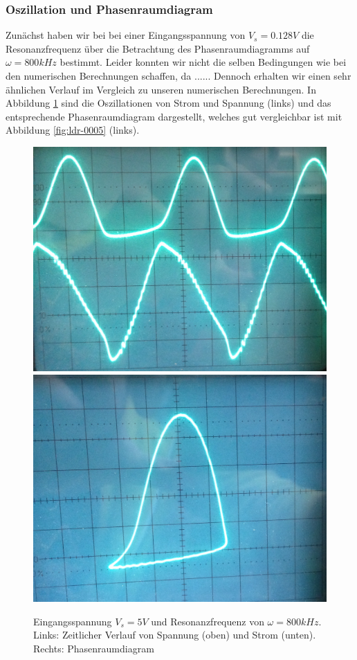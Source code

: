 \documentclass{scrartcl}
\begin{document}
\subsubsection { Oszillation und Phasenraumdiagram }
Zunächst haben wir bei bei einer Eingangsspannung von $V_s=0.128V$ die Resonanzfrequenz über die Betrachtung des Phasenraumdiagramms auf $\omega=800kHz$ bestimmt. Leider konnten wir nicht die selben Bedingungen wie bei den numerischen Berechnungen schaffen, da ...... Dennoch erhalten wir einen sehr ähnlichen Verlauf im Vergleich zu unseren numerischen Berechnungen. In Abbildung \ref{fig:ldr-real1} sind die Oszillationen von Strom und Spannung (links) und das entsprechende Phasenraumdiagram dargestellt, welches gut vergleichbar ist mit Abbildung \ref{fig:ldr-0005} (links).
\begin{figure}
\centering
\includegraphics[scale=0.1]{800khz-5V-oszi}
\includegraphics[scale=0.11]{800khz-5V-phase}
\caption{Eingangsspannung $V_s=5V$ und Resonanzfrequenz von $\omega=800kHz$. Links: Zeitlicher Verlauf von Spannung (oben) und Strom (unten). Rechts: Phasenraumdiagram}
\label{fig:ldr-real1}
\end{figure}
\end{document}
